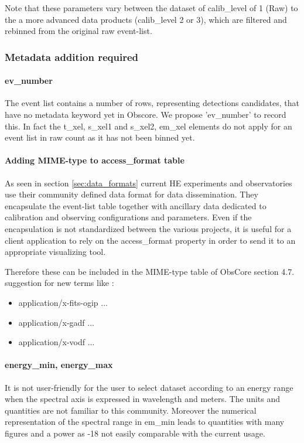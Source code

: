\documentclass[11pt,a4paper]{ivoa}
\begin{document}
Note that these parameters vary between the dataset of calib\_level of 1 (Raw) to the a more advanced data products (calib\_level 2 or 3), which are filtered and rebinned from the original raw event-list.


\subsubsection{Metadata addition required}

\paragraph{ev\_number}
The event list contains a number of rows, representing detections candidates, that have no metadata keyword yet in Obscore.
We propose 'ev\_number' to record this.
In fact the t\_xel, s\_xel1 and s\_xel2, em\_xel elements do not apply for an event list in raw count as it has not been binned yet.

\paragraph{Adding MIME-type to access\_format table}
As seen in section \ref{sec:data_formats} current HE experiments and observatories use their community defined data format for data dissemination.
They encapsulate the event-list table together with ancillary data dedicated to calibration and observing configurations and parameters.
Even if the encapsulation is not standardized between the various projects, it is useful for a client application to rely on the access\_format property in order to send it to an appropriate visualizing tool.

Therefore these can be included in the MIME-type table of ObsCore section 4.7. suggestion for new terms like :
\begin{itemize}
\item application/x-fits-ogip ...
\item application/x-gadf  ...
\item application/x-vodf  ...
\end{itemize}

\paragraph{energy\_min, energy\_max}
It is not user-friendly for the user to select dataset according to an energy range when the spectral axis is expressed in wavelength and meters. The units and quantities are not familiar to this community.
Moreover the numerical representation of the spectral range in em\_min leads to quantities with many figures and a power as -18 not easily comparable with the current usage.
\end{document}
